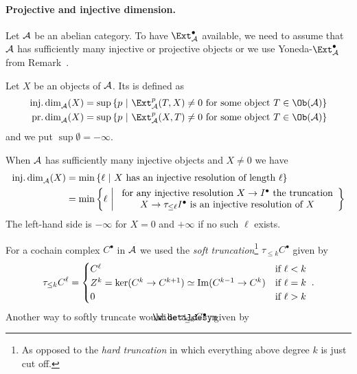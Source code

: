 \documentclass[a4paper,parskip=half,numbers=enddot, DIV=12]{scrreprt}
\begin{document}
\paragraph{Projective and injective dimension.} Let $\mathcal{A}$ be an abelian category. To have $\Ext_\Aa^\bullet$ available, we need to assume that $\mathcal{A}$ has sufficiently many injective or projective objects or we use Yoneda-$\Ext_\Aa^\bullet$ from Remark~.
\begin{defi}
	Let $X$ be an objects of $\mathcal{A}$. Its  is defined as
	\begin{align*}
		\idim_\Aa(X)&=\sup\left\{p\st \Ext_\Aa^p(T,X)\neq 0\text{ for some object }T\in\Ob(\Aa)\right\}\\
		\pdim_\Aa(X)&=\sup\left\{p\st \Ext_\Aa^p(X,T)\neq 0\text{ for some object }T\in\Ob(\Aa)\right\}
	\end{align*}
	and we put $\sup\emptyset =-\infty$.
\end{defi}
\begin{fact}
	When $\mathcal{A}$ has sufficiently many injective objects and $X\neq 0$ we have
	\begin{align*}
		\idim_\Aa(X)&=\min\left\{\ell\st X\text{ has an injective resolution of length }\ell\right\}\\
	&=	\min\left\{\ell\st\begin{array}{c}
	\text{for any injective resolution }X\morphism I^\bullet\text{ the truncation}\\
	X\morphism\tau_{\leq\ell}I^\bullet\text{ is an injective resolution of }X
	\end{array}
	\right\}
	\end{align*}
	The left-hand side is $-\infty$ for $X=0$ and $+\infty$ if no such $\ell$ exists. 
\end{fact}
For a cochain complex $C^\bullet$ in $\mathcal{A}$ we used the \emph{soft truncation}\footnote{As opposed to the \emph{hard truncation} in which everything above degree $k$ is just cut off.} $\tau_{\leq k}C^\bullet$ given by 
\begin{align*}
	\tau_{\leq k}C^\ell=\begin{cases}
	C^\ell & \text{if }\ell<k\\
	Z^k=\ker(C^k\morphism C^{k+1})\simeq \Im(C^{k-1}\morphism C^k) & \text{if }\ell=k\\
	0 & \text{if }\ell>k
	\end{cases}\;.
\end{align*}
Another way to softly truncate would be $\snake{\tau}_{\leq k}C^\bullet$, given by
\end{document}
